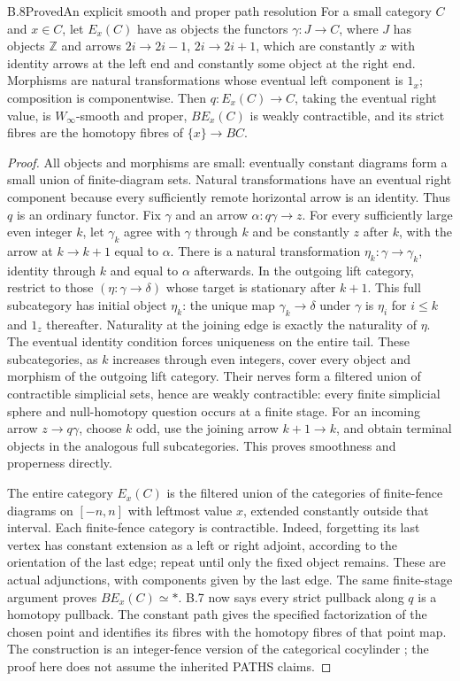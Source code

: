 \begin{claim}{B.8}{Proved}{An explicit smooth and proper path resolution}
For a small category $C$ and $x\in C$, let $E_x(C)$ have as objects the
functors $\gamma:J\to C$, where $J$ has objects $\mathbb Z$ and arrows
$2i\to2i-1$, $2i\to2i+1$, which are constantly $x$ with identity arrows
at the left end and constantly some object at the right end. Morphisms are
natural transformations whose eventual left component is $1_x$; composition
is componentwise. Then $q:E_x(C)\to C$, taking the eventual right value,
is $W_\infty$-smooth and proper, $BE_x(C)$ is weakly contractible, and its
strict fibres are the homotopy fibres of $\{x\}\to BC$.
\end{claim}
\begin{proof}
All objects and morphisms are small: eventually constant diagrams form a
small union of finite-diagram sets. Natural transformations have an eventual
right component because every sufficiently remote horizontal arrow is an
identity. Thus $q$ is an ordinary functor.
Fix $\gamma$ and an arrow $\alpha:q\gamma\to z$. For every sufficiently
large even integer $k$, let $\gamma_k$ agree with $\gamma$ through $k$ and
be constantly $z$ after $k$, with the arrow at $k\to k+1$ equal to $\alpha$.
There is a natural transformation $\eta_k:\gamma\to\gamma_k$, identity
through $k$ and equal to $\alpha$ afterwards. In the outgoing lift category,
restrict to those $(\eta:\gamma\to\delta)$ whose target is stationary after
$k+1$. This full subcategory has initial object $\eta_k$: the unique map
$\gamma_k\to\delta$ under $\gamma$ is $\eta_i$ for $i\leq k$ and
$1_z$ thereafter. Naturality at the joining edge is exactly the naturality
of $\eta$. The eventual identity condition forces uniqueness on the entire
tail. These subcategories, as $k$ increases through even integers, cover
every object and morphism of the outgoing lift category. Their nerves form
a filtered union of contractible simplicial sets, hence are weakly
contractible: every finite simplicial sphere and null-homotopy question occurs
at a finite stage. For an incoming arrow $z\to q\gamma$, choose $k$ odd,
use the joining arrow $k+1\to k$, and obtain terminal objects in the analogous
full subcategories. This proves smoothness and properness directly.

The entire category $E_x(C)$ is the filtered union of the categories of
finite-fence diagrams on $[-n,n]$ with leftmost value $x$, extended constantly
outside that interval. Each finite-fence category is contractible. Indeed,
forgetting its last vertex has constant extension as a left or right adjoint,
according to the orientation of the last edge; repeat until only the fixed
object remains. These are actual adjunctions, with components given by the
last edge. The same finite-stage argument proves $BE_x(C)\simeq *$.
B.7 now says every strict pullback along $q$ is a homotopy pullback.
The constant path gives the specified factorization of the chosen point and
identifies its fibres with the homotopy fibres of that point map.
The construction is an integer-fence version of the categorical cocylinder
\citep{BCEvrard1975}; the proof here does not assume the inherited PATHS claims.
\end{proof}

